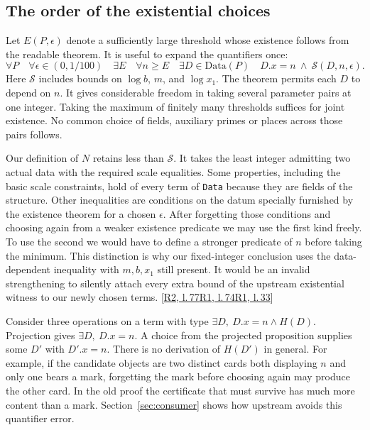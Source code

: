 \documentclass[12pt,letterpaper]{article}
\newcommand{\id}[1]{{\small\nolinkurl{#1}}}
\begin{document}
\subsection{The order of the existential choices}
Let $E(P,\epsilon)$ denote a sufficiently large threshold whose existence follows from the readable theorem. It is useful to expand the quantifiers once:
\[
 \forall P\quad\forall \epsilon\in(0,1/100)\quad
 \exists E\quad\forall n\ge E\quad
 \exists D\in\mathrm{Data}(P)\quad D.x=n\ \wedge\ \mathcal S(D,n,\epsilon).
\]
Here $\mathcal S$ includes bounds on $\log b$, $m$, and $\log x_1$. The theorem permits each $D$ to depend on $n$. It gives considerable freedom in taking several parameter pairs at one integer. Taking the maximum of finitely many thresholds suffices for joint existence. No common choice of fields, auxiliary primes or places across those pairs follows.

Our definition of $N$ retains less than $\mathcal S$. It takes the least integer admitting two actual data with the required scale equalities. Some properties, including the basic scale constraints, hold of every term of \id{Data} because they are fields of the structure. Other inequalities are conditions on the datum specially furnished by the existence theorem for a chosen $\epsilon$. After forgetting those conditions and choosing again from a weaker existence predicate we may use the first kind freely. To use the second we would have to define a stronger predicate of $n$ before taking the minimum. This distinction is why our fixed-integer conclusion uses the data-dependent inequality with $m,b,x_1$ still present. It would be an invalid strengthening to silently attach every extra bound of the upstream existential witness to our newly chosen terms.  {\footnotesize\sffamily\color{mute}[\href{https://github.com/leanprover-community/riemann-hypothesis/blob/e063a923620ee7787b4a1270421478645bf66bdb/src/New/Reduction/Data/AdmissibleData.lean\#L77}{R2, l.\,77}\enspace \href{https://github.com/leanprover-community/riemann-hypothesis/blob/e063a923620ee7787b4a1270421478645bf66bdb/src/New/Reduction/OneSidedBound.lean\#L74}{R1, l.\,74}\enspace \href{https://github.com/leanprover-community/riemann-hypothesis/blob/e063a923620ee7787b4a1270421478645bf66bdb/src/New/Reduction/OneSidedBound.lean\#L33}{R1, l.\,33}]}

Consider three operations on a term with type $\exists D,\ D.x=n\wedge H(D)$. Projection gives $\exists D,\ D.x=n$. A choice from the projected proposition supplies some $D'$ with $D'.x=n$. There is no derivation of $H(D')$ in general. For example, if the candidate objects are two distinct cards both displaying $n$ and only one bears a mark, forgetting the mark before choosing again may produce the other card. In the old proof the certificate that must survive has much more content than a mark. Section~\ref{sec:consumer} shows how upstream avoids this quantifier error.
\end{document}

